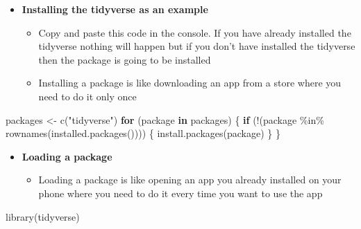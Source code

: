 \documentclass[
  ignorenonframetext,
]{beamer}
\newenvironment{Shaded}{\begin{snugshade}}{\end{snugshade}}
\newcommand{\ControlFlowTok}[1]{\textcolor[rgb]{0.00,0.23,0.31}{\textbf{#1}}}
\newcommand{\FunctionTok}[1]{\textcolor[rgb]{0.28,0.35,0.67}{#1}}
\newcommand{\NormalTok}[1]{\textcolor[rgb]{0.00,0.23,0.31}{#1}}
\newcommand{\OtherTok}[1]{\textcolor[rgb]{0.00,0.23,0.31}{#1}}
\newcommand{\SpecialCharTok}[1]{\textcolor[rgb]{0.37,0.37,0.37}{#1}}
\newcommand{\StringTok}[1]{\textcolor[rgb]{0.13,0.47,0.30}{#1}}
\providecommand{\tightlist}{%
  \setlength{\itemsep}{0pt}\setlength{\parskip}{0pt}}\usepackage{longtable,booktabs,array}
\begin{document}
\begin{frame}[fragile]{}
\label{section-10}
\begin{itemize}
\item
  \textbf{Installing the tidyverse as an example}

  \begin{itemize}
  \item
    Copy and paste this code in the console. If you have already
    installed the tidyverse nothing will happen but if you don't have
    installed the tidyverse then the package is going to be installed
  \item
    Installing a package is like downloading an app from a store where
    you need to do it only once
  \end{itemize}
\end{itemize}

\tiny

\begin{Shaded}
\begin{Highlighting}[]
\NormalTok{packages }\OtherTok{\textless{}{-}} \FunctionTok{c}\NormalTok{(}\StringTok{"tidyverse"}\NormalTok{)}
\ControlFlowTok{for}\NormalTok{ (package }\ControlFlowTok{in}\NormalTok{ packages) \{}
  \ControlFlowTok{if}\NormalTok{ (}\SpecialCharTok{!}\NormalTok{(package }\SpecialCharTok{\%in\%} \FunctionTok{rownames}\NormalTok{(}\FunctionTok{installed.packages}\NormalTok{()))) \{}
    \FunctionTok{install.packages}\NormalTok{(package)}
\NormalTok{  \}}
\NormalTok{\}}
\end{Highlighting}
\end{Shaded}

\normalsize

\begin{itemize}
\item
  \textbf{Loading a package}

  \begin{itemize}
  \tightlist
  \item
    Loading a package is like opening an app you already installed on
    your phone where you need to do it every time you want to use the
    app
  \end{itemize}
\end{itemize}

\tiny

\begin{Shaded}
\begin{Highlighting}[]
\FunctionTok{library}\NormalTok{(tidyverse)}
\end{Highlighting}
\end{Shaded}
\end{frame}
\end{document}
